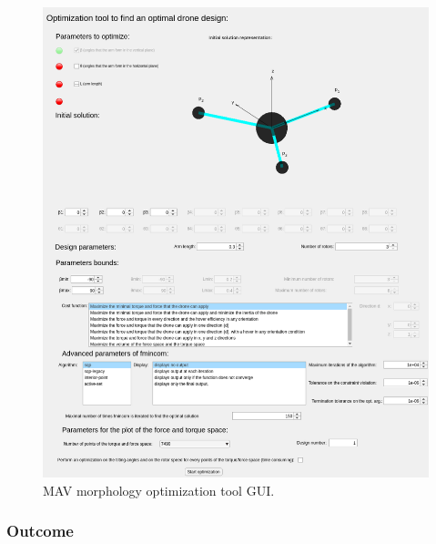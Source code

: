 \begin{figure}[!h]
  \centering
  \includegraphics[width=1.0\textwidth]{images/gui.png}
  \caption{MAV morphology optimization tool GUI.}
  \label{fig:gui}
\end{figure}

\subsubsection{Outcome}
\label{sec:outcome}

